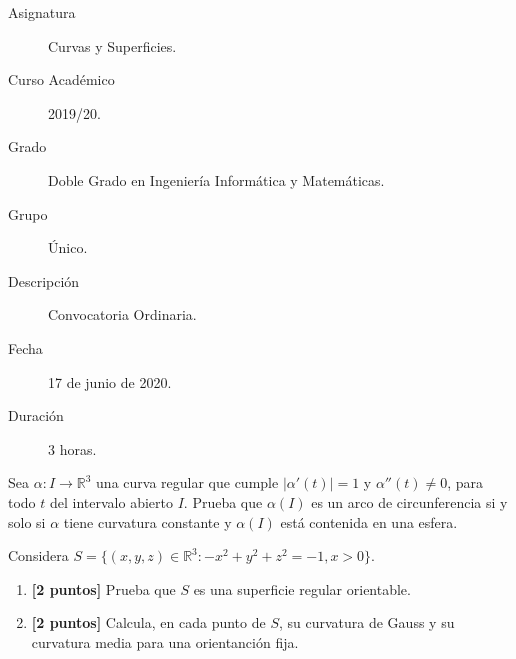 \documentclass[12pt]{article}
\begin{document}

    
    

    \begin{description}
        \item[Asignatura] Curvas y Superficies.
        \item[Curso Académico] 2019/20.
        \item[Grado] Doble Grado en Ingeniería Informática y Matemáticas.
        \item[Grupo] Único.
        \item[Descripción] Convocatoria Ordinaria.
        \item[Fecha] 17 de junio de 2020.
        \item[Duración] 3 horas.
    \end{description}
    \newpage


    
    \begin{ejercicio}[3 puntos]
        Sea $\alpha:I\to\mathbb{R}^3$ una curva regular que cumple $|\alpha'(t)| = 1$ y $\alpha''(t) \neq 0$, para todo $t$ del intervalo abierto $I$. Prueba que $\alpha(I)$ es un arco de circunferencia si y solo si $\alpha$ tiene curvatura constante y $\alpha(I)$ está contenida en una esfera.
    \end{ejercicio}

    \begin{ejercicio}
        Considera $S = \{(x,y,z)\in \mathbb{R}^3 : -x^2+y^2+z^2 = -1, x > 0\}$.
        \begin{enumerate}[label=\alph*)]
            \item \textbf{[2 puntos]} Prueba que $S$ es una superficie regular orientable.
            \item \textbf{[2 puntos]} Calcula, en cada punto de $S$, su curvatura de Gauss y su curvatura media para una orientanción fija.
        \end{enumerate}
    \end{ejercicio}
\end{document}
